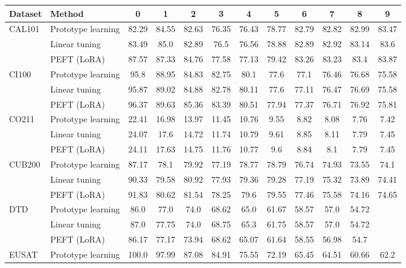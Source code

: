 \begin{tabular}{l l cccccccccc}
\midrule
\textbf{Dataset} & \textbf{Method} & \textbf{0} & \textbf{1} & \textbf{2} & \textbf{3} & \textbf{4} & \textbf{5} & \textbf{6} & \textbf{7} & \textbf{8} & \textbf{9} \\ \midrule
\multirow{3}{*}{CAL101} & Prototype learning & 82.29 & 84.55 & 82.63 & 76.35 & 76.43 & 78.77 & 82.79 & 82.82 & 82.99 & 83.47 \\
 & Linear tuning & 83.49 & 85.0 & 82.89 & 76.5 & 76.56 & 78.88 & 82.89 & 82.92 & 83.14 & 83.6 \\
 & PEFT (LoRA) & 87.57 & 87.33 & 84.76 & 77.58 & 77.13 & 79.42 & 83.26 & 83.23 & 83.4 & 83.87 \\
\midrule
\multirow{3}{*}{CI100} & Prototype learning & 95.8 & 88.95 & 84.83 & 82.75 & 80.1 & 77.6 & 77.1 & 76.46 & 76.68 & 75.58 \\
 & Linear tuning & 95.87 & 89.02 & 84.88 & 82.78 & 80.11 & 77.6 & 77.11 & 76.47 & 76.69 & 75.58 \\
 & PEFT (LoRA) & 96.37 & 89.63 & 85.36 & 83.39 & 80.51 & 77.94 & 77.37 & 76.71 & 76.92 & 75.81 \\
\midrule
\multirow{3}{*}{CO211} & Prototype learning & 22.41 & 16.98 & 13.97 & 11.45 & 10.76 & 9.55 & 8.82 & 8.08 & 7.76 & 7.42 \\
 & Linear tuning & 24.07 & 17.6 & 14.72 & 11.74 & 10.79 & 9.61 & 8.85 & 8.11 & 7.79 & 7.45 \\
 & PEFT (LoRA) & 24.11 & 17.63 & 14.75 & 11.76 & 10.77 & 9.6 & 8.84 & 8.1 & 7.79 & 7.45 \\
\midrule
\multirow{3}{*}{CUB200} & Prototype learning & 87.17 & 78.1 & 79.92 & 77.19 & 78.77 & 78.79 & 76.74 & 74.93 & 73.55 & 74.1 \\
 & Linear tuning & 90.33 & 79.58 & 80.92 & 77.93 & 79.36 & 79.28 & 77.19 & 75.32 & 73.89 & 74.41 \\
 & PEFT (LoRA) & 91.83 & 80.62 & 81.54 & 78.25 & 79.6 & 79.55 & 77.46 & 75.58 & 74.16 & 74.65 \\
\midrule
\multirow{3}{*}{DTD} & Prototype learning & 86.0 & 77.0 & 74.0 & 68.62 & 65.0 & 61.67 & 58.57 & 57.0 & 54.72 \\
 & Linear tuning & 87.0 & 77.75 & 74.0 & 68.75 & 65.3 & 61.75 & 58.57 & 57.0 & 54.72 \\
 & PEFT (LoRA) & 86.17 & 77.17 & 73.94 & 68.62 & 65.07 & 61.64 & 58.55 & 56.98 & 54.7 \\
\midrule
\multirow{3}{*}{EUSAT} & Prototype learning & 100.0 & 97.99 & 87.08 & 84.91 & 75.55 & 72.19 & 65.45 & 64.51 & 60.66 & 62.2 \\

\end{tabular}

